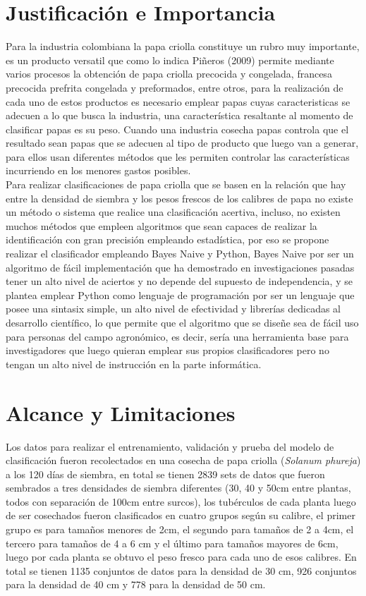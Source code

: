 \section{Justificaci\'on e Importancia}

Para la industria colombiana la papa criolla constituye un rubro muy importante, es un producto versatil que como lo indica Piñeros (2009) permite mediante varios procesos la obtención de papa criolla precocida y congelada, francesa precocida prefrita congelada y preformados, entre otros, para la realización de cada uno de estos productos es necesario emplear papas cuyas caracteristicas se adecuen a lo que busca la industria, una característica resaltante al momento de clasificar papas es su peso. Cuando una industria cosecha papas controla que el resultado sean papas que se adecuen al tipo de producto que luego van a generar, para ellos usan diferentes métodos que les permiten controlar las características incurriendo en los menores gastos posibles.\\

Para realizar clasificaciones de papa criolla que se basen en la relación que hay entre la densidad de siembra y los pesos frescos de los calibres de papa no existe un método o sistema que realice una clasificación acertiva, incluso, no existen muchos métodos que empleen algoritmos que sean capaces de realizar la identificación con gran precisión empleando estadística, por eso se propone realizar el clasificador empleando Bayes Naive y Python, Bayes Naive por ser un algoritmo de fácil implementación que ha demostrado en investigaciones pasadas tener un alto nivel de aciertos y no depende del supuesto de independencia, y se plantea emplear Python como lenguaje de programación por ser un lenguaje que posee una sintasix simple, un alto nivel de efectividad y librerías dedicadas al desarrollo científico, lo que permite que el algoritmo que se diseñe sea de fácil uso para personas del campo agronómico, es decir, sería una herramienta base para investigadores que luego quieran emplear sus propios clasificadores pero no tengan un alto nivel de instrucción en la parte informática. 
	
\section{Alcance y Limitaciones}

Los datos para realizar el entrenamiento, validación y prueba del modelo de clasificación fueron recolectados en una cosecha de papa criolla (\textit{Solanum phureja}) a los 120 días de siembra, en total se tienen 2839 sets de datos que fueron sembrados a tres densidades de siembra diferentes (30, 40 y 50cm entre plantas, todos con separación de 100cm entre surcos), los tubérculos de cada planta luego de ser cosechados fueron clasificados en cuatro grupos según su calibre, el primer grupo es para tamaños menores de 2cm, el segundo para tamaños de 2 a 4cm, el tercero para tamaños de 4 a 6 cm y el último para tamaños mayores de 6cm, luego por cada planta se obtuvo el peso fresco para cada uno de esos calibres. En total se tienen 1135 conjuntos de datos para la densidad de 30 cm, 926 conjuntos para la densidad de 40 cm y 778 para la densidad de 50 cm.\\

